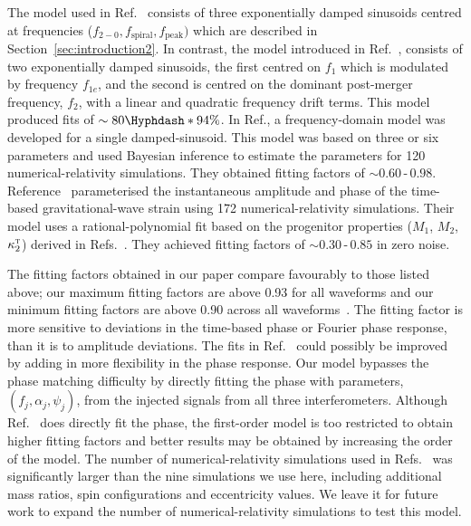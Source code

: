 \documentclass[../Thesis.tex]{subfiles}
\begin{document}
    The model used in Ref.~\cite{Bauswein2016} consists of three exponentially damped sinusoids centred at frequencies ($f_{2-0}, f_{\mathrm{spiral}}, f_{\mathrm{peak}})$ which are described in Section~\ref{sec:introduction2}.
    In contrast, the model introduced in Ref.~\cite{Bose2018}, consists of two exponentially damped sinusoids, the first centred on $f_1$ which is modulated by frequency $f_{1e}$, and the second is centred on the dominant post-merger frequency, $f_2$, with a linear and quadratic frequency drift terms. 
    This model produced fits of $\sim 80\Hyphdash*94\%$. 
    In Ref.\cite{Tsang2019}, a frequency-domain model was developed for a single damped-sinusoid.
    This model was based on three or six parameters and used Bayesian inference to estimate the parameters for 120 numerical-relativity simulations. 
    They obtained fitting factors of $\sim\!0.60\,$\nobreakdash-$\,0.98$. 
    Reference~\cite{Breschi2019} parameterised the instantaneous amplitude and phase of the time-based gravitational-wave strain using 172 numerical-relativity simulations. 
    Their model uses a rational-polynomial fit based on the progenitor properties ($M_1$, $M_2$, $\kappa_2^\textsc{t}$) derived in Refs.~\cite{Bernuzzi2015,Zappa2018,Dietrich2019}.
    They achieved fitting factors of $\sim\!0.30\,$\nobreakdash-$\,0.85$ in zero noise.\par
    The fitting factors obtained in our paper compare favourably to those listed above; our maximum fitting factors are above 0.93 for all waveforms \cite[cf.][]{Hotokezaka2013} and our minimum fitting factors are above 0.90 across all waveforms~\cite[cf.][]{Tsang2019,Breschi2019}. 
    The fitting factor is more sensitive to deviations in the time-based phase or Fourier phase response, than it is to amplitude deviations. 
    The fits in Ref.~\cite{Breschi2019} could possibly be improved by adding in more flexibility in the phase response.
    Our model bypasses the phase matching difficulty by directly fitting the phase with parameters, $(f_j, \alpha_j, \psi_j)$, from the injected signals from all three interferometers.
    Although Ref.~\cite{Tsang2019} does directly fit the phase, the first-order model is too restricted to obtain higher fitting factors and better results may be obtained by increasing the order of the model.
    The number of numerical-relativity simulations used in Refs.~\cite{Hotokezaka2013,Tsang2019,Breschi2019} was significantly larger than the nine simulations we use here, including additional mass ratios, spin configurations and eccentricity values. 
    We leave it for future work to expand the number of numerical-relativity simulations to test this model.\par
    
\end{document}
